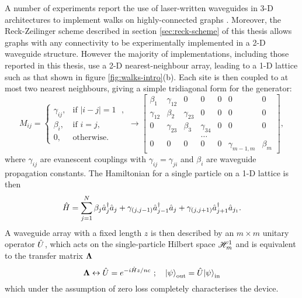 A number of experiments report the use of laser-written waveguides in 3-D architectures to implement walks on highly-connected graphs \cite{Rechtsman2013, Meinecke2013a}. 
Moreover, the Reck-Zeilinger scheme described in section \ref{sec:reck-scheme} of this thesis allows graphs with any connectivity to be experimentally implemented in a 2-D waveguide structure.
However the majority of implementations, including those reported in this thesis, use a 2-D nearest-neighbour array, leading to a 1-D lattice such as that shown in figure \ref{fig:walks-intro}(b). Each site is then coupled to at most two nearest neighbours, giving a simple tridiagonal form for the generator:
\begin{equation}
  M_{ij}=\begin{cases}
    \gamma_{ij}, & \text{if $|i-j| = 1$ },\\
    \beta_{i},   & \text{if $i=j$},\\
    0, & \text{otherwise}.
  \end{cases}
  \rightarrow
  \begin{bmatrix}
  \beta_1 & \gamma_{12} & 0 & 0 & 0  & 0 & 0\\
  \gamma_{12} & \beta_2 & \gamma_{23} & 0  & 0 & 0 & 0\\
  0 & \gamma_{23} & \beta_3 & \gamma_{34} & 0 & 0  & 0\\
  & & & \ldots & & & \\
  0 & 0 & 0 & 0 &  0 & \gamma_{m-1, m} & \beta_m 
  \end{bmatrix},
\end{equation}   
where $\gamma_{ij}$ are evanescent couplings with $\gamma_{ij}=\gamma_{ji}$ and $\beta_i$ are waveguide propagation constants. The Hamiltonian for a single particle on a 1-D lattice is then
\begin{equation}
   \hat{H}   = \sum_{j=1}^N \beta_j \hat{a}^{\dagger}_j \hat{a}_j 
                  + \gamma_{(j, j-1)} \hat{a}^{\dagger}_{j-1}\hat{a}_{j} 
                  + \gamma_{(j, j+1)} \hat{a}^{\dagger}_{j+1}\hat{a}_{j_1}.
                  \label{eqn:quantum-walk-hamiltonian}
\end{equation}
A waveguide array with a fixed length $z$ is then described by an $m \times m$ unitary operator $\hat{U}$, which acts on the single-particle Hilbert space $\mathscr{H}_{m}^1$ and is equivalent to the transfer matrix $\mathbf{\Lambda}$
\begin{equation}
    \mathbf{\Lambda} \leftrightarrow \hat{U} = e^{-i \hat{H} z/nc}~; \quad \mbox{$ | \psi \rangle $}_{\mathrm{out}}= \hat{U} \mbox{$ | \psi \rangle $}_{\mathrm{in}}
    \label{eqn:quantum-walk-unitary}
\end{equation}
which under the assumption of zero loss completely characterises the device.

